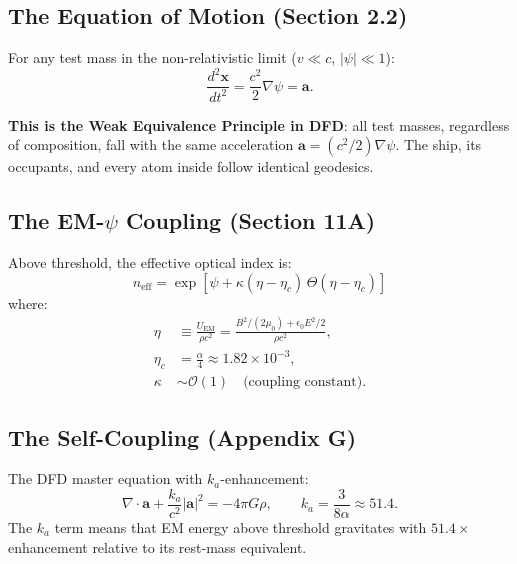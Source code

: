 \documentclass[12pt, letterpaper]{article}
\theoremstyle{definition}
\theoremstyle{remark}
\newcommand{\neff}{n_{\mathrm{eff}}}
\newcommand{\avec}{\mathbf{a}}
\newcommand{\ka}{k_a}
\newcommand{\etac}{\eta_c}
\begin{document}
\subsection{The Equation of Motion (Section 2.2)}

For any test mass in the non-relativistic limit ($v \ll c$, $|\psi| \ll 1$):
\begin{equation}
\frac{d^2 \mathbf{x}}{dt^2} = \frac{c^2}{2} \nabla \psi = \avec.
\label{eq:geodesic-acceleration}
\end{equation}

\textbf{This is the Weak Equivalence Principle in DFD}: all test masses,
regardless of composition, fall with the same acceleration $\avec = (c^2/2)\nabla\psi$.
The ship, its occupants, and every atom inside follow identical geodesics.

\subsection{The EM-$\psi$ Coupling (Section 11A)}

Above threshold, the effective optical index is:
\begin{equation}
\boxed{
\neff = \exp\!\left[\psi + \kappa(\eta - \etac)\,\Theta(\eta - \etac)\right]
}
\label{eq:neff}
\end{equation}
where:
\begin{align}
\eta &\equiv \frac{U_{\mathrm{EM}}}{\rho c^2} = \frac{B^2/(2\mu_0) + \epsilon_0 E^2/2}{\rho c^2}, \\
\etac &= \frac{\alpha}{4} \approx 1.82 \times 10^{-3}, \\
\kappa &\sim \mathcal{O}(1) \quad \text{(coupling constant)}.
\end{align}

\subsection{The Self-Coupling (Appendix G)}

The DFD master equation with $\ka$-enhancement:
\begin{equation}
\nabla \cdot \avec + \frac{\ka}{c^2} |\avec|^2 = -4\pi G \rho,
\qquad \ka = \frac{3}{8\alpha} \approx 51.4.
\label{eq:master}
\end{equation}
The $\ka$ term means that EM energy above threshold gravitates with
$51.4\times$ enhancement relative to its rest-mass equivalent.

\end{document}
